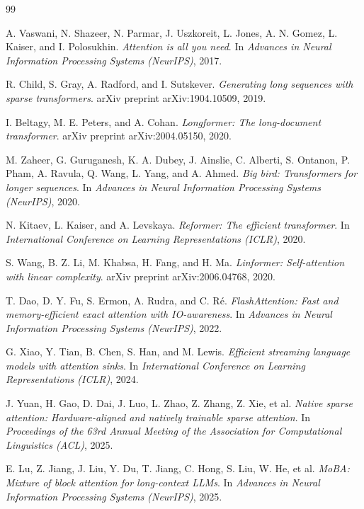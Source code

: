 \documentclass{article}
\begin{document}
\begin{thebibliography}{99}

A. Vaswani, N. Shazeer, N. Parmar, J. Uszkoreit, L. Jones, A. N. Gomez, L. Kaiser, and I. Polosukhin.
\textit{Attention is all you need}.
In \textit{Advances in Neural Information Processing Systems (NeurIPS)}, 2017.

R. Child, S. Gray, A. Radford, and I. Sutskever.
\textit{Generating long sequences with sparse transformers}.
arXiv preprint arXiv:1904.10509, 2019.

I. Beltagy, M. E. Peters, and A. Cohan.
\textit{Longformer: The long-document transformer}.
arXiv preprint arXiv:2004.05150, 2020.

M. Zaheer, G. Guruganesh, K. A. Dubey, J. Ainslie, C. Alberti, S. Ontanon, P. Pham, A. Ravula, Q. Wang, L. Yang, and A. Ahmed.
\textit{Big bird: Transformers for longer sequences}.
In \textit{Advances in Neural Information Processing Systems (NeurIPS)}, 2020.

N. Kitaev, L. Kaiser, and A. Levskaya.
\textit{Reformer: The efficient transformer}.
In \textit{International Conference on Learning Representations (ICLR)}, 2020.

S. Wang, B. Z. Li, M. Khabsa, H. Fang, and H. Ma.
\textit{Linformer: Self-attention with linear complexity}.
arXiv preprint arXiv:2006.04768, 2020.

T. Dao, D. Y. Fu, S. Ermon, A. Rudra, and C. Ré.
\textit{FlashAttention: Fast and memory-efficient exact attention with IO-awareness}.
In \textit{Advances in Neural Information Processing Systems (NeurIPS)}, 2022.

G. Xiao, Y. Tian, B. Chen, S. Han, and M. Lewis.
\textit{Efficient streaming language models with attention sinks}.
In \textit{International Conference on Learning Representations (ICLR)}, 2024.

J. Yuan, H. Gao, D. Dai, J. Luo, L. Zhao, Z. Zhang, Z. Xie, et al.
\textit{Native sparse attention: Hardware-aligned and natively trainable sparse attention}.
In \textit{Proceedings of the 63rd Annual Meeting of the Association for Computational Linguistics (ACL)}, 2025.

E. Lu, Z. Jiang, J. Liu, Y. Du, T. Jiang, C. Hong, S. Liu, W. He, et al.
\textit{MoBA: Mixture of block attention for long-context LLMs}.
In \textit{Advances in Neural Information Processing Systems (NeurIPS)}, 2025.

\end{thebibliography}
\end{document}
